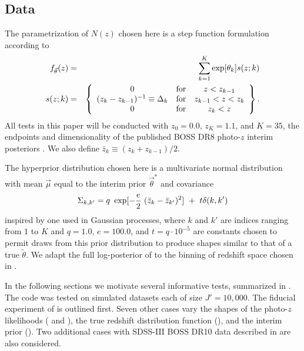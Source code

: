 \subsection{Data}

The parametrization of $N(z)$ chosen here is a step function formulation according to
\begin{eqnarray}
\eqlabel{eq:steps}
f_{\vec{\theta}}(z)&=&\sum_{k=1}^{K}\exp[\theta_{k}]s(z;k)\\
s(z;k)&=&\left\{\begin{array}{ccc}0&\text{for}&z<z_{k-1}\\(z_{k}-z_{k-1})^{-1} \equiv\Delta_{k}&\text{for}&z_{k-1}<z<z_{k}\\0&\text{for}&z_{k}<z\end{array}\right
\}.
\end{eqnarray}
All tests in this paper will be conducted with $z_{0}=0.0$, $z_{K}=1.1$, and $K=35$, the endpoints and dimensionality of the published BOSS DR8 photo-$z$ interim posteriors \citet{Sheldon2012}.  
We also define $\bar{z}_{k}\equiv(z_{k}+z_{k-1})/2$.

The hyperprior distribution chosen here is a multivariate normal distribution with mean $\vec{\mu}$ equal to the interim prior $\vec{\theta}^{*}$ and covariance
\begin{equation}
\eqlabel{eq:priorcov}
\Sigma_{k,k'} = q\ \exp[-\frac{e}{2}\ (\bar{z}_{k}-\bar{z}_{k'})^{2}]\ +\ t\delta(k,k')
\end{equation}
inspired by one used in Gaussian processes, where $k$ and $k'$ are indices ranging from $1$ to $K$ and $q=1.0$, $e=100.0$, and $t=q\cdot10^{-5}$ are constants chosen to permit draws from this prior distribution to produce shapes similar to that of a true $\tilde{\theta}$.  
We adapt the full log-posterior of  to the binning of redshift space chosen in .

In the following sections we motivate several informative tests, summarized in .  
The code was tested on simulated datasets each of size $J'=10,000$.  
The fiducial experiment of  is outlined first. 
Seven other cases vary the shapes of the photo-$z$ likelihoods ( and ), the true redshift distribution function (), and the interim prior ().  
Two additional cases with SDSS-III BOSS DR10 data described in  are also considered.

